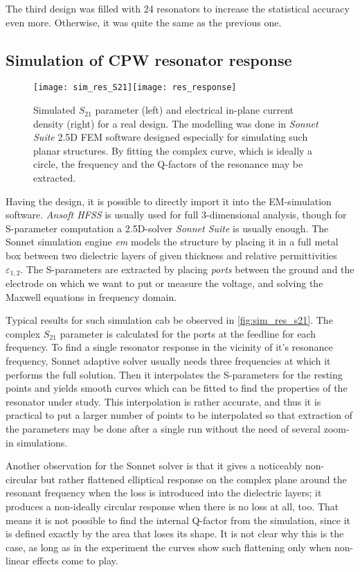 \documentclass[12pt, twoside]{report}
\numberwithin{equation}{section}
\begin{document}
The third design was filled with 24 resonators to increase the statistical accuracy even more. Otherwise, it was quite the same as the previous one.

\subsection{Simulation of CPW resonator response}

\begin{figure}[t]
\centering
\texttt{[image: sim\_res\_S21]}\quad \texttt{[image: res\_response]}
\caption{Simulated $S_{21}$ parameter (left) and electrical in-plane current density (right) for a real design. The modelling was done in \textit{Sonnet Suite} 2.5D FEM software designed especially for simulating such planar structures. By fitting the complex curve, which is ideally a circle, the frequency and the Q-factors of the resonance may be extracted.}
\label{fig:sim_res_s21}
\end{figure}

Having the design, it is possible to directly import it into the EM-simulation software. \textit{Ansoft HFSS} is usually used for full 3-dimensional analysis, though for S-parameter computation a 2.5D-solver \textit{Sonnet Suite} is usually enough. The Sonnet simulation engine \textit{em} models the structure by placing it in a full metal box between two dielectric layers of given thickness and relative permittivities $\varepsilon_{1,2}$. The S-parameters are extracted by placing \textit{ports} between the ground and the electrode on which we want to put or measure the voltage, and solving the Maxwell equations in frequency domain. 

Typical results for such simulation cab be observed in \autoref{fig:sim_res_s21}. The complex $S_{21}$ parameter is calculated for the ports at the feedline for each frequency. To find a single resonator response in the vicinity of it's resonance frequency, Sonnet adaptive solver usually needs three frequencies at which it performs the full solution. Then it interpolates the S-parameters for the resting points and yields smooth curves which can be fitted to find the properties of the resonator under study. This interpolation is rather accurate, and thus it is practical to put a larger number of points to be interpolated so that extraction of the parameters may be done after a single run without the need of several zoom-in simulations.

Another observation for the Sonnet solver is that it gives a noticeably non-circular but rather flattened elliptical response on the complex plane around the resonant frequency when the loss is introduced into the dielectric layers; it produces a non-ideally circular response when there is no loss at all, too. That means it is not possible to find the internal Q-factor from the simulation, since it is defined exactly by the area that loses its shape. It is not clear why this is the case, as long as in the experiment the curves show such flattening only when non-linear effects come to play.\cite{astafiev2010}
\end{document}

